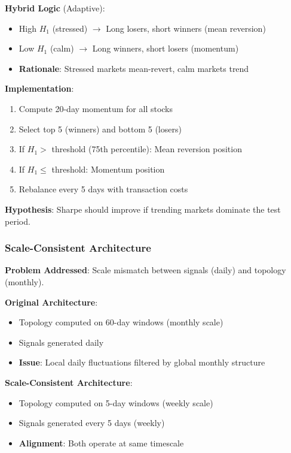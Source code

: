 \textbf{Hybrid Logic} (Adaptive):
\begin{itemize}
\item High $H_1$ (stressed) $\rightarrow$ Long losers, short winners (mean reversion)
\item Low $H_1$ (calm) $\rightarrow$ Long winners, short losers (momentum)
\item \textbf{Rationale}: Stressed markets mean-revert, calm markets trend
\end{itemize}

\textbf{Implementation}:
\begin{enumerate}
\item Compute 20-day momentum for all stocks
\item Select top 5 (winners) and bottom 5 (losers)
\item If $H_1 >$ threshold (75th percentile): Mean reversion position
\item If $H_1 \leq$ threshold: Momentum position
\item Rebalance every 5 days with transaction costs
\end{enumerate}

\textbf{Hypothesis}: Sharpe should improve if trending markets dominate the test period.

\subsubsection{Scale-Consistent Architecture}

\textbf{Problem Addressed}: Scale mismatch between signals (daily) and topology (monthly).

\textbf{Original Architecture}:
\begin{itemize}
\item Topology computed on 60-day windows (monthly scale)
\item Signals generated daily
\item \textbf{Issue}: Local daily fluctuations filtered by global monthly structure
\end{itemize}

\textbf{Scale-Consistent Architecture}:
\begin{itemize}
\item Topology computed on 5-day windows (weekly scale)
\item Signals generated every 5 days (weekly)
\item \textbf{Alignment}: Both operate at same timescale
\end{itemize}

